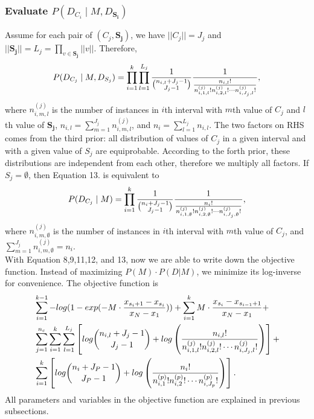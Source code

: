 \subsubsection{Evaluate $P(D_{C_i} \mid M, D_{\boldsymbol{S_i}})$}
Assume for each pair of $(C_j, \boldsymbol{S_j})$, we have $||C_j || = J_j$ and $|| \boldsymbol{S_j} || = L_j = \prod_{v \in \boldsymbol{S_j}} || v ||$. Therefore,
\begin{equation}
P(D_{C_j}  \mid M, D_{S_j}) =
\prod_{i=1}^{k} \prod_{l=1}^{L_j} {{1}\over{{n_{i,l} + J_j - 1}\choose{J_j-1}}}
{{1}\over{ {{n_{i,l}}!}\over{ {n^{(j)}_{i,1,l} !} {n^{(j)}_{i,2,l} !} \cdots {n^{(j)}_{i,J_j,l} !}}  }},
\end{equation}
where $n^{(j)}_{i,m,l}$ is the number of instances in $i$th interval with $m$th value of $C_j$ and $l$th value of $\boldsymbol{S_j}$, $n_{i,l} = \sum_{m=1}^{J_j} n^{(j)}_{i,m,l}$, and $n_i = \sum_{l=1}^{L_j} n_{i,l}$. The two factors on RHS comes from the third prior: all distribution of values of $C_j$ in a given interval and with a given value of $S_j$ are equiprobable. According to the forth prior, these distributions are independent from each other, therefore we multiply all factors. If $S_j = \emptyset$, then Equation 13. is equivalent to
\begin{equation}
P(D_{C_j}  \mid M) =
\prod_{i=1}^{k}  {{1}\over{{n_{i} + J_j - 1}\choose{J_j-1}}}
{{1}\over{ {{n_{i}}!}\over{ {n^{(j)}_{i,1,\emptyset} !} {n^{(j)}_{i,2,\emptyset} !} \cdots {n^{(j)}_{i,J_j,\emptyset} !}}  }},
\end{equation}
where $n^{(j)}_{i,m,\emptyset}$ is the number of instances in $i$th interval with $m$th value of $C_j$, and $\sum_{m=1}^{J_j} n^{(j)}_{i,m,\emptyset} = n_i$. \\

With Equation 8,9,11,12, and 13, now we are able to write down the objective function. Instead of maximizing $P(M) \cdot P(D|M)$, we minimize its log-inverse for convenience. The objective function is
\begin{equation}
\begin{aligned}
& \sum_{i=1}^{k-1} - log(1 - {exp(- M \cdot {{x_{s_i+1} - x_{s_i}}\over{x_N - x_1}})}) +  \sum_{i=1}^{k} M \cdot {{x_{s_{i}} - x_{s_{i-1} + 1}}\over{x_N - x_1}} +\\
&  \sum_{j=1}^{n_c} \sum_{i=1}^{k}  \sum_{l=1}^{L_j} \left[  log{{n_{i,l} + J_j - 1}\choose{J_j-1}} + log \left( { {{n_{i,l}}!}\over{ {n^{(j)}_{i,1,l} !} {n^{(j)}_{i,2,l} !} \cdots {n^{(j)}_{i,J_j,l} !}} } \right) \right] + \\
& \sum_{i=1}^k \left[  log {{n_{i} + J_P - 1}\choose{J_P-1}} + log \left( { {{n_i}!}\over{ {n^{(p)}_{i,1} !} {n^{(p)}_{i,2} !} \cdots {n^{(p)}_{i,J_p} !}} } \right) \right].
\end{aligned}
\end{equation}
All parameters and variables in the objective function are explained in previous subsections.
